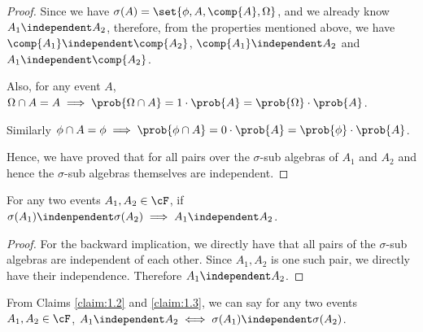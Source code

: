 \documentclass[a4paper,10pt]{article}
\begin{document}
\begin{question}
\begin{claim}
\begin{proof}
			Since we have $\sigma(A) = \set{\phi, A, \comp{A}, \Omega}$, and we already know $A_1 \independent A_2$, therefore, from the properties mentioned above, we have $\comp{A_1} \independent \comp{A_2}$,  $\comp{A_1} \independent A_2$ and  $A_1 \independent \comp{A_2}$.

			Also, for any event $A$, $\Omega \cap A = A \implies \prob{\Omega \cap A} = 1 \cdot \prob{A} = \prob{\Omega} \cdot \prob{A}$.

			Similarly $\phi \cap A = \phi \implies \prob{\phi \cap A} = 0 \cdot \prob{A} = \prob{\phi} \cdot \prob{A}$.

			Hence, we have proved that for all pairs over the $\sigma$-sub algebras of $A_1$ and $A_2$ and hence the $\sigma$-sub algebras themselves are independent.
		\end{proof}
	\end{claim}

	\begin{claim}
		\label{claim:1.3}
		For any two events $A_1, A_2 \in \cF$, if $\sigma(A_1) \indenpendent \sigma(A_2) \implies A_1 \independent A_2$.

		\begin{proof}
			For the backward implication, we directly have that all pairs of the $\sigma$-sub algebras are independent of each other. Since $A_1, A_2$ is one such pair, we directly have their independence. Therefore $A_1 \independent A_2$.
		\end{proof}
	\end{claim}

	From Claims \ref{claim:1.2} and \ref{claim:1.3}, we can say for any two events $A_1, A_2 \in \cF$, $A_1 \independent A_2 \iff \sigma(A_1) \independent \sigma(A_2)$.

\end{question}
\end{document}
